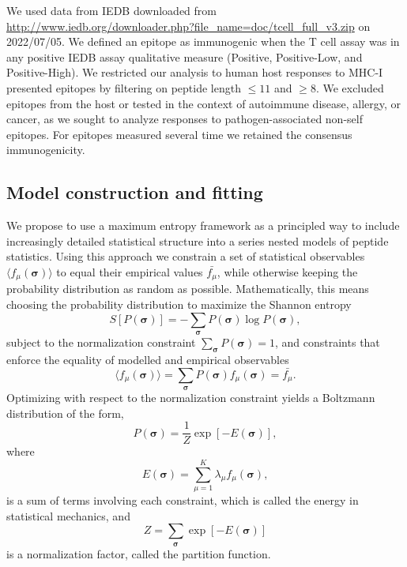 \documentclass[superscriptaddress,twocolumn,pre]{revtex4}
\newcommand{\B}{\boldsymbol}
\newcommand{\<}{\langle}
\renewcommand{\>}{\rangle}
\begin{document}
We used data from IEDB \cite{Vita2019} downloaded from \url{http://www.iedb.org/downloader.php?file_name=doc/tcell_full_v3.zip} on 2022/07/05. We defined an epitope as immunogenic when the T cell assay was in any positive IEDB assay qualitative measure (Positive, Positive-Low, and Positive-High). We restricted our analysis to human host responses to MHC-I presented epitopes by filtering on peptide length $\leq11$ and $\geq8$. We excluded epitopes from the host or tested in the context of autoimmune disease, allergy, or cancer, as we sought to analyze responses to pathogen-associated non-self epitopes. For epitopes measured several time we retained the consensus immunogenicity.

\subsection{Model construction and fitting}
We propose to use a maximum entropy framework as a principled way to include increasingly detailed statistical structure into a series nested models of peptide statistics. Using this approach we constrain a set of statistical observables $\langle f_\mu(\boldsymbol \sigma)\rangle$ to equal their empirical values $\bar{f_\mu}$, while otherwise keeping the probability distribution as random as possible. Mathematically, this means choosing the probability distribution to maximize the Shannon entropy
\begin{equation}
    S[P(\B \sigma)] = - \sum_{\B \sigma} P(\B \sigma) \log P(\B \sigma),
\end{equation}
subject to the normalization constraint $\sum_{\B \sigma} P(\B \sigma) = 1$, and constraints that enforce the equality of modelled and empirical observables
\begin{equation}
    \langle f_\mu(\boldsymbol \sigma)\rangle = \sum_{\boldsymbol \sigma} P(\boldsymbol \sigma) f_\mu(\boldsymbol \sigma) = \bar{f_\mu}.
\end{equation}
Optimizing with respect to the normalization constraint yields a Boltzmann distribution of the form,
\begin{equation}
    P(\boldsymbol \sigma) = \frac{1}{Z} \exp\left[ -E(\B \sigma) \right],
\end{equation}
where
\begin{equation}
 E(\B \sigma) = \sum_{\mu=1}^K \lambda_\mu f_\mu(\boldsymbol \sigma),
\end{equation}
is a sum of terms involving each constraint, which is called the energy in statistical mechanics, and 
\begin{equation}
    Z = \sum_{\B \sigma} \exp \left[ - E(\B \sigma) \right]
\end{equation}
is a normalization factor, called the partition function.
\end{document}
